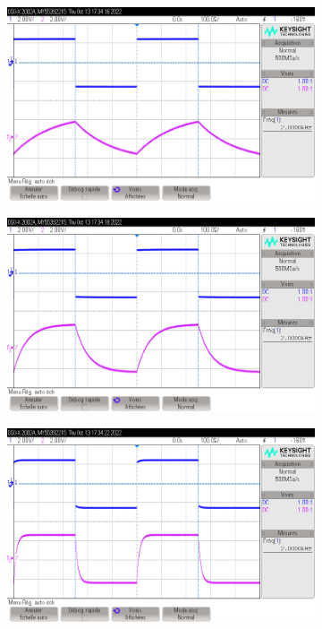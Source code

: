 \documentclass[a4paper]{article}
\begin{document}
\begin{multicols}
\begin{figure}[H]
	\centering
	\begin{subfigure}[H]{0.45\textwidth}
		\centering
		\includegraphics[width=\textwidth]{figures/scope_25.png}
		\caption{}
	\end{subfigure}

	\begin{subfigure}[H]{0.45\textwidth}
		\centering
		\includegraphics[width=\textwidth]{figures/scope_26.png}
		\caption{}
	\end{subfigure}

	\begin{subfigure}[H]{0.45\textwidth}
		\centering
		\includegraphics[width=\textwidth]{figures/scope_28.png}
		\caption{}
	\end{subfigure}


\end{figure}
\end{multicols}
\end{document}
